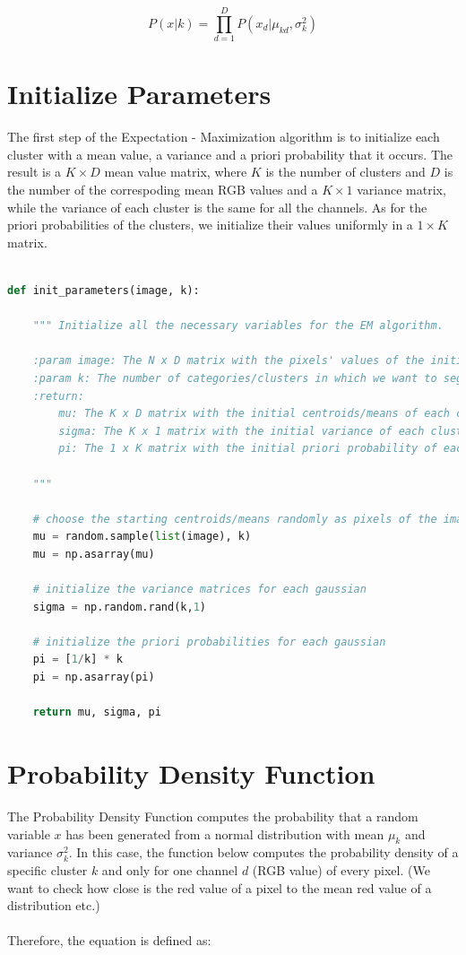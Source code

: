 \documentclass[11pt]{article}
\begin{document}
$$
P(x|k) = \prod_{d=1}^{D} P(x_{d}| \mu_{kd}, \sigma_{k}^2)
$$

\newpage

\section{Initialize Parameters}
The first step of the Expectation - Maximization algorithm is to initialize each cluster with a mean value, a variance and a priori probability that it occurs. The result is a $K \times D $ mean value matrix, where $K$ is the number of clusters and $D$ is the number of the correspoding mean RGB values and a $ K \times 1$ variance matrix, while the variance of each cluster is the same for all the channels.
As for the priori probabilities of the clusters, we initialize their values uniformly in a $1 \times K$ matrix.

\begin{lstlisting}[language = Python]

def init_parameters(image, k):
    
    """ Initialize all the necessary variables for the EM algorithm.
    
    :param image: The N x D matrix with the pixels' values of the initial            image
    :param k: The number of categories/clusters in which we want to segment          the image
    :return: 
        mu: The K x D matrix with the initial centroids/means of each cluster
        sigma: The K x 1 matrix with the initial variance of each cluster
        pi: The 1 x K matrix with the initial priori probability of each             cluster
    
    """
    
    # choose the starting centroids/means randomly as pixels of the image
    mu = random.sample(list(image), k)
    mu = np.asarray(mu)
    
    # initialize the variance matrices for each gaussian
    sigma = np.random.rand(k,1)
    
    # initialize the priori probabilities for each gaussian
    pi = [1/k] * k
    pi = np.asarray(pi)
    
    return mu, sigma, pi
\end{lstlisting}
\newpage
\section{Probability Density Function}

The Probability Density Function computes the probability that a random variable $x$ has been generated from a normal distribution with mean $μ_{k}$ and variance $\sigma_{k}^2$. In this case, the function below computes the probability density of a specific cluster $k$ and only for one channel $d$ (RGB value) of every pixel.
(We want to check how close is the red value of a pixel to the mean red value of a distribution etc.)\\
\\
Therefore, the equation is defined as:
\end{document}
